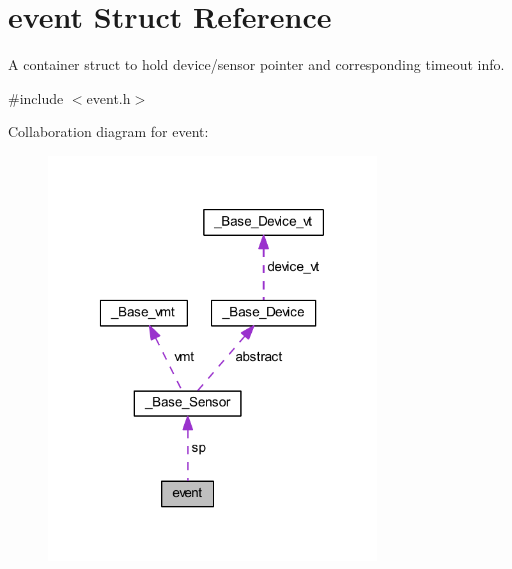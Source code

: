 \hypertarget{structevent}{\section{event Struct Reference}
\label{structevent}
}


A container struct to hold device/sensor pointer and corresponding timeout info.  




{\ttfamily \#include $<$event.\-h$>$}



Collaboration diagram for event\-:
\nopagebreak
\begin{figure}[H]
\begin{center}
\leavevmode
\includegraphics[width=247pt]{structevent__coll__graph}
\end{center}
\end{figure}
